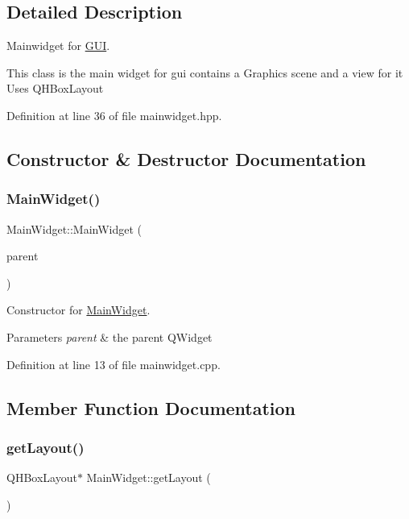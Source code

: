 \subsection{Detailed Description}
Mainwidget for \mbox{\hyperlink{classGUI}{G\+UI}}. 

This class is the main widget for gui contains a Graphics scene and a view for it Uses Q\+H\+Box\+Layout 

Definition at line 36 of file mainwidget.\+hpp.



\subsection{Constructor \& Destructor Documentation}
\mbox{\label{classMainWidget_a62f5aa5fe2314c6221ac49b328b72e8b}} 
\subsubsection{\texorpdfstring{Main\+Widget()}{MainWidget()}}
{\footnotesize\ttfamily Main\+Widget\+::\+Main\+Widget (\begin{DoxyParamCaption}\item[{Q\+Widget $\ast$}]{parent }\end{DoxyParamCaption})}



Constructor for \mbox{\hyperlink{classMainWidget}{Main\+Widget}}. 


\begin{DoxyParams}{Parameters}
{\em parent} & the parent Q\+Widget \\
\hline
\end{DoxyParams}


Definition at line 13 of file mainwidget.\+cpp.



\subsection{Member Function Documentation}
\mbox{\label{classMainWidget_a639b465bb49eb31e1c09051ae047951f}} 
\subsubsection{\texorpdfstring{get\+Layout()}{getLayout()}}
{\footnotesize\ttfamily Q\+H\+Box\+Layout$\ast$ Main\+Widget\+::get\+Layout (\begin{DoxyParamCaption}{ }\end{DoxyParamCaption})\hspace{0.3cm}{\ttfamily [inline]}}



